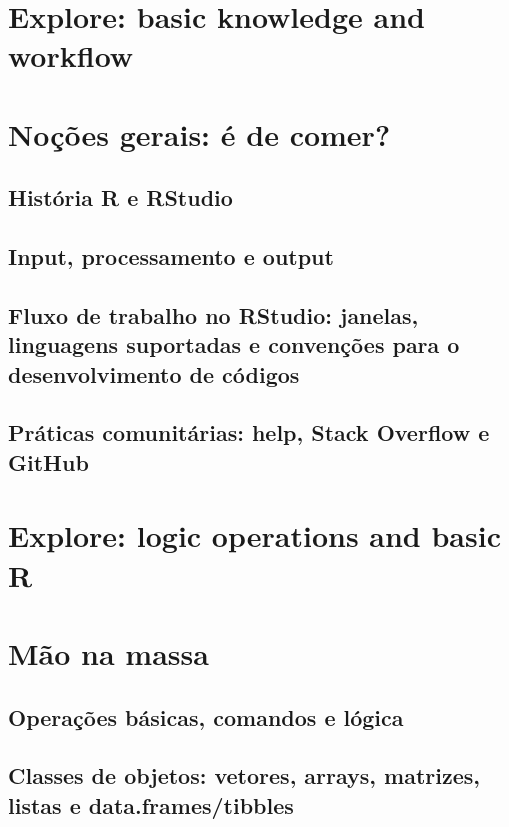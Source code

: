 \documentclass[a4paper,12pt]{article}
\begin{document}


\section{Explore: basic knowledge and workflow}
\section*{Noções gerais: é de comer?}
\subsection*{História R e RStudio}
\subsection*{Input, processamento e output}
\subsection*{Fluxo de trabalho no RStudio: janelas, linguagens suportadas e convenções para o desenvolvimento de códigos}
\subsection*{Práticas comunitárias: help, Stack Overflow e GitHub}

\section{Explore: logic operations and basic R}
\section*{Mão na massa}
\subsection*{Operações básicas, comandos e lógica}
\subsection*{Classes de objetos: vetores, arrays, matrizes, listas e data.frames/tibbles}
\end{document}
